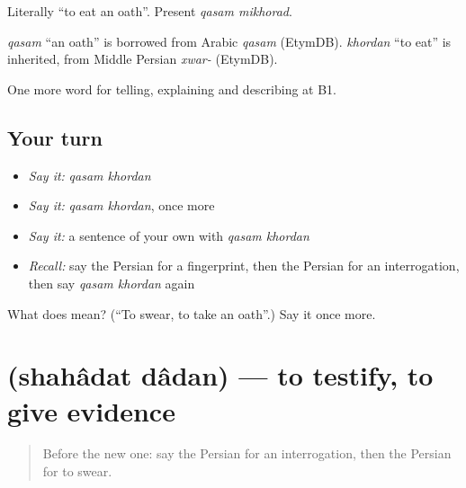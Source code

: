 Literally \textquotedblleft{}to eat an oath\textquotedblright{}. Present \emph{qasam mikhorad}.

\begin{cousinweb}
\emph{qasam} \textquotedblleft{}an oath\textquotedblright{} is borrowed from Arabic \emph{qasam} (EtymDB). \emph{khordan} \textquotedblleft{}to eat\textquotedblright{} is inherited, from Middle Persian \emph{xwar-} (EtymDB).
\end{cousinweb}

\begin{grammarlens}[title={What you've built}]
One more word for telling, explaining and describing at B1.
\end{grammarlens}

\subsection*{Your turn}
\begin{itemize}
\raggedright
  \item \emph{Say it:} \emph{qasam khordan}
  \item \emph{Say it:} \emph{qasam khordan}, once more
  \item \emph{Say it:} a sentence of your own with \emph{qasam khordan}
  \item \emph{Recall:} say the Persian for a fingerprint, then the Persian for an interrogation, then say \emph{qasam khordan} again
\end{itemize}

\begin{tcolorbox}[breakable,colback=teal!4,colframe=teal!35!black,title={Before you move on}]
What does   mean? (\textquotedblleft{}To swear, to take an oath\textquotedblright{}.) Say it once more.
\end{tcolorbox}
\section[\texorpdfstring{\fa{شهادت} \fa{دادن} (shahâdat dâdan)}{شهادت دادن (shahâdat dâdan)}]{  (shahâdat dâdan) — to testify, to give evidence}

\label{lesson:FA-C321-shahadat-dadan}



\begin{quote}
Before the new one: say the Persian for an interrogation, then the Persian for to swear.
\end{quote}

